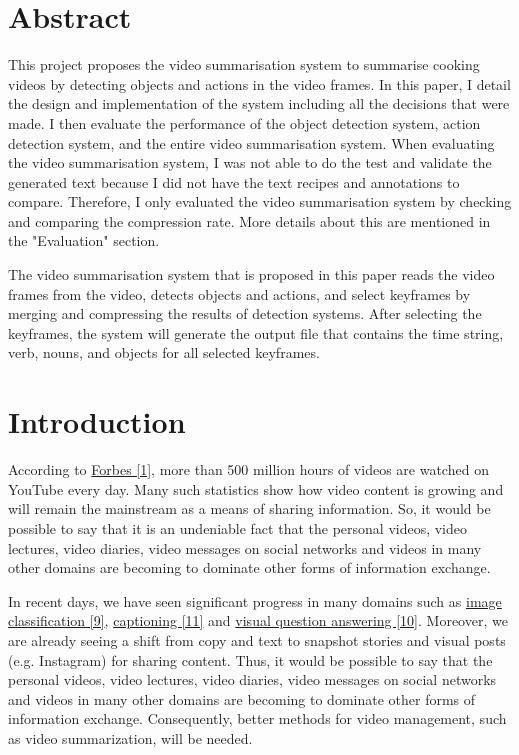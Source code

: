 \documentclass{article}
\begin{document}
\newpage

\section*{Abstract}

This project proposes the video summarisation system to summarise cooking videos by detecting objects and actions in the video frames. In this paper, I detail the design and implementation of the system including all the decisions that were made. I then evaluate the performance of the object detection system, action detection system, and the entire video summarisation system. When evaluating the video summarisation system, I was not able to do the test and validate the generated text because I did not have the text recipes and annotations to compare. Therefore, I only evaluated the video summarisation system by checking and comparing the compression rate. More details about this are mentioned in the "Evaluation" section.

The video summarisation system that is proposed in this paper reads the video frames from the video, detects objects and actions, and select keyframes by merging and compressing the results of detection systems. After selecting the keyframes, the system will generate the output file that contains the time string, verb, nouns, and objects for all selected keyframes.

\newpage

\tableofcontents

\newpage

\section{Introduction}

According to \hyperlink{ref1}{Forbes [1]}, more than 500 million hours of videos are watched on YouTube every day. Many such statistics show how video content is growing and will remain the mainstream as a means of sharing information. So, it would be possible to say that it is an undeniable fact that the personal videos, video lectures, video diaries, video messages on social networks and videos in many other domains are becoming to dominate other forms of information exchange.

In recent days, we have seen significant progress in many domains such as \hyperlink{ref9}{image classification [9]}, \hyperlink{ref11}{captioning [11]} and \hyperlink{ref10}{visual question answering [10]}. Moreover, we are already seeing a shift from copy and text to snapshot stories and visual posts (e.g. Instagram) for sharing content. Thus, it would be possible to say that the personal videos, video lectures, video diaries, video messages on social networks and videos in many other domains are becoming to dominate other forms of information exchange. Consequently, better methods for video management, such as video summarization, will be needed. 
\end{document}
